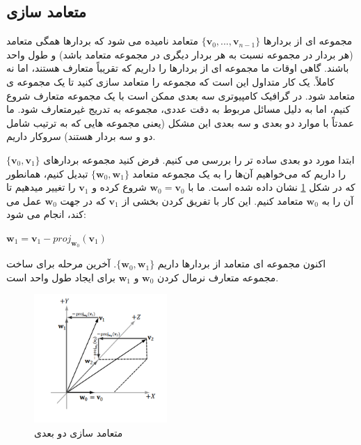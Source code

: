\subsection{\textbf{متعامد سازی}}
\label{sec:3.1}
{
    \Large
    \begin{spacing}{1.5}
        مجموعه ای از بردارها $\{\textbf{v}_{0},...,\textbf{v}_{n-1}\}$ متعامد نامیده می شود که بردارها همگی متعامد (هر بردار در مجموعه نسبت به هر بردار دیگری در مجموعه متعامد باشد) و طول واحد باشند.
        گاهی اوقات ما مجموعه ای از بردارها را داریم که تقریباً متعارف هستند، اما نه کاملاً.
        یک کار متداول این است که مجموعه را متعامد سازی کنید تا یک مجموعه ی متعامد شود.
        در گرافیک کامپیوتری سه بعدی ممکن است با یک مجموعه متعارف شروع کنیم، اما به دلیل مسائل مربوط به دقت عددی، مجموعه به تدریج غیرمتعارف شود.
        ما عمدتاً با موارد دو بعدی و سه بعدی این مشکل (یعنی مجموعه هایی که به ترتیب شامل دو و سه بردار هستند) سروکار داریم.

        ابتدا مورد دو بعدی ساده تر را بررسی می کنیم.
        فرض کنید مجموعه بردارهای $\{\textbf{v}_{0},\textbf{v}_{1}\}$ را داریم که می‌خواهیم آن‌ها را به یک مجموعه متعامد $\{\textbf{w}_{0},\textbf{w}_{1}\}$ تبدیل کنیم،
        همانطور که در شکل \ref{fig:4.Session.1.1.11} نشان داده شده است.
        ما با $\textbf{w}_{0}=\textbf{v}_{0}$ شروع کرده و $\textbf{v}_{1}$ را تغییر میدهیم تا آن را به $\textbf{w}_{0}$ متعامد کنیم.
        این کار با تفریق کردن بخشی از $\textbf{v}_{1}$ که در جهت $\textbf{w}_{0}$  عمل می کند، انجام می شود:

        \begin{center}
            $\textbf{w}_{1}=\textbf{v}_{1}-proj_{\textbf{w}_{0}}(\textbf{v}_{1})$
        \end{center}

        اکنون مجموعه ای متعامد از بردارها داریم $\{\textbf{w}_{0},\textbf{w}_{1}\}$.
        آخرین مرحله برای ساخت مجموعه متعارف نرمال کردن $\textbf{w}_{0}$ و $\textbf{w}_{1}$ برای ایجاد طول واحد است.

        \begin{figure}[H]
            \centering
            \setlength{\belowcaptionskip}{-10pt}
            \includegraphics[width=0.45\textwidth]{Images/4/4.Session.1.1.11}
            \caption{متعامد سازی دو بعدی}
            \label{fig:4.Session.1.1.11}
        \end{figure}


\end{spacing}}
